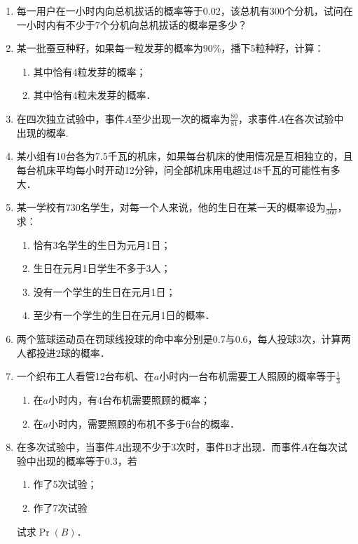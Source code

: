 \begin{enumerate}
\item 每一用户在一小时内向总机拔话的概率等于0.02，该总机有300个分机，试问在一小时内有不少于7个分机向总机拔话的概率是多少？

\item 某一批蚕豆种籽，如果每一粒发芽的概率为90\%，播下5粒种籽，计算：
\begin{enumerate}[(1)]
    \item 其中恰有4粒发芽的概率；
    \item 其中恰有4粒未发芽的概率．
\end{enumerate}

\item 在四次独立试验中，事件$A$至少出现一次的概率为$\frac{80}{81}$，求事件$A$在各次试验中出现的概率.
\item 某小组有10台各为7.5千瓦的机床，如果每台机床的使用情况是互相独立的，且每台机床平均每小时开动12分钟，问全部机床用电超过48千瓦的可能性有多大．
\item 某一学校有730名学生，对每一个人来说，他的生日在某一天的概率设为$\frac{1}{360}$，求：
\begin{enumerate}[(1)]
\item 恰有3名学生的生日为元月1日；
\item 生日在元月1日学生不多于3人；
\item 没有一个学生的生日在元月1日；
\item 至少有一个学生的生日在元月1日的概率．
\end{enumerate}

\item 两个篮球运动员在罚球线投球的命中率分别是0.7与0.6，每人投球3次，计算两人都投进2球的概率．
\item 一个织布工人看管12台布机、在$a$小时内一台布机需要工人照顾的概率等于$\frac{1}{3}$
\begin{enumerate}[(1)]
\item 在$a$小时内，有4台布机需要照顾的概率；
\item 在$a$小时内，需要照顾的布机不多于6台的概率．
\end{enumerate}

\item 在多次试验中，当事件$A$出现不少于3次时，事件B才出现．而事件$A$在每次试验中出现的概率等于0.3，若
\begin{multicols}{2}
    \begin{enumerate}[(1)]
    \item 作了5次试验；
    \item 作了7次试验
\end{enumerate}
\end{multicols}
试求$\Pr(B)$．


\end{enumerate}
